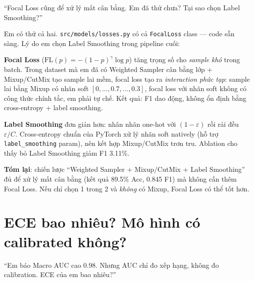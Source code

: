 \documentclass[11pt,a4paper]{article}
\begin{document}
\begin{question}
``Focal Loss cũng để xử lý mất cân bằng. Em đã thử chưa? Tại sao chọn Label Smoothing?''
\end{question}

\begin{answer}
Em có thử cả hai. \texttt{src/models/losses.py} có cả \texttt{FocalLoss} class --- code sẵn sàng. Lý do em chọn Label Smoothing trong pipeline cuối:

\textbf{Focal Loss} ($\mathrm{FL}(p) = -(1-p)^\gamma \log p$) tăng trọng số cho \textit{sample khó} trong batch. Trong dataset mà em đã có Weighted Sampler cân bằng lớp + Mixup/CutMix tạo sample lai mềm, focal loss tạo ra \textit{interaction phức tạp}: sample lai bằng Mixup có nhãn soft $[0, ..., 0.7, ..., 0.3]$, focal loss với nhãn soft không có công thức chính tắc, em phải tự chế. Kết quả: F1 dao động, không ổn định bằng cross-entropy + label smoothing.

\textbf{Label Smoothing} đơn giản hơn: nhân nhãn one-hot với $(1-\varepsilon)$ rồi rải đều $\varepsilon/C$. Cross-entropy chuẩn của PyTorch xử lý nhãn soft natively (hỗ trợ \texttt{label\_smoothing} param), nên kết hợp Mixup/CutMix trơn tru. Ablation cho thấy bỏ Label Smoothing giảm F1 3.11\%.

\textbf{Tóm lại}: chiến lược ``Weighted Sampler + Mixup/CutMix + Label Smoothing'' đủ để xử lý mất cân bằng (kết quả 89.5\% Acc, 0.845 F1) mà không cần thêm Focal Loss. Nếu chỉ chọn 1 trong 2 và \textit{không} có Mixup, Focal Loss có thể tốt hơn.
\end{answer}

\section{ECE bao nhiêu? Mô hình có calibrated không?}

\begin{question}
``Em báo Macro AUC cao 0.98. Nhưng AUC chỉ đo xếp hạng, không đo calibration. ECE của em bao nhiêu?''
\end{question}
\end{document}
